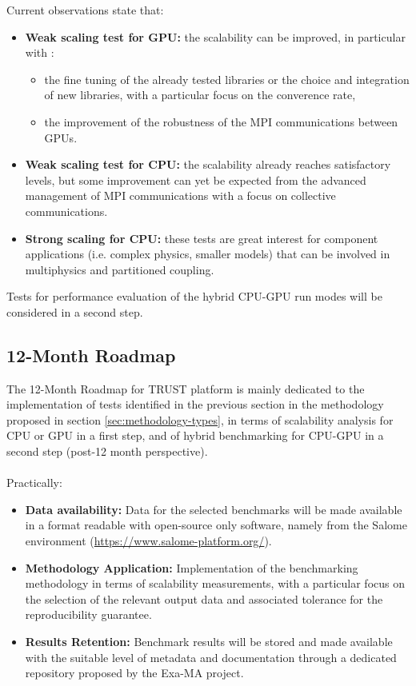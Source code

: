 Current observations state that:

\begin{itemize}
    \item \textbf{Weak scaling test for GPU: } the scalability can be improved, in particular with :
    \begin{itemize}
        \item the fine tuning of the already tested libraries or the choice and integration of new libraries, with a particular focus on the converence rate,
        \item the improvement of the robustness of the MPI communications between GPUs.
    \end{itemize}
    \item\textbf{Weak scaling test for CPU: } the scalability already reaches satisfactory levels, but some improvement can yet be expected from the advanced management of MPI communications with a focus on collective communications.
    \item \textbf{Strong scaling for CPU: } these tests are great interest for component applications (i.e. complex physics, smaller models) that can be involved in multiphysics and partitioned coupling.
\end{itemize}

Tests for performance evaluation of the hybrid CPU-GPU run modes will be considered in a second step.

\subsection{12-Month Roadmap}
\label{sec:WP3:TRUST Platform:roadmap}

The 12-Month Roadmap for TRUST platform is mainly dedicated to the implementation of tests identified in the previous section in the methodology proposed in section \ref{sec:methodology-types}, in terms of scalability analysis for CPU or GPU in a first step, and of hybrid benchmarking for CPU-GPU in a second step (post-12 month perspective).\\
\\
Practically:
\begin{itemize}
    \item \textbf{Data availability:} Data for the selected benchmarks will be made available in a format readable with open-source only software, namely from the Salome environment (\href{https://www.salome-platform.org/}{https://www.salome-platform.org/}).
    \item \textbf{Methodology Application:} Implementation of the benchmarking methodology in terms of scalability measurements, with a particular focus on the selection of the relevant output data and associated tolerance for the reproducibility guarantee.
    \item \textbf{Results Retention:} Benchmark results will be stored and made available with the suitable level of metadata and documentation through a dedicated repository proposed by the Exa-MA project.
\end{itemize}

